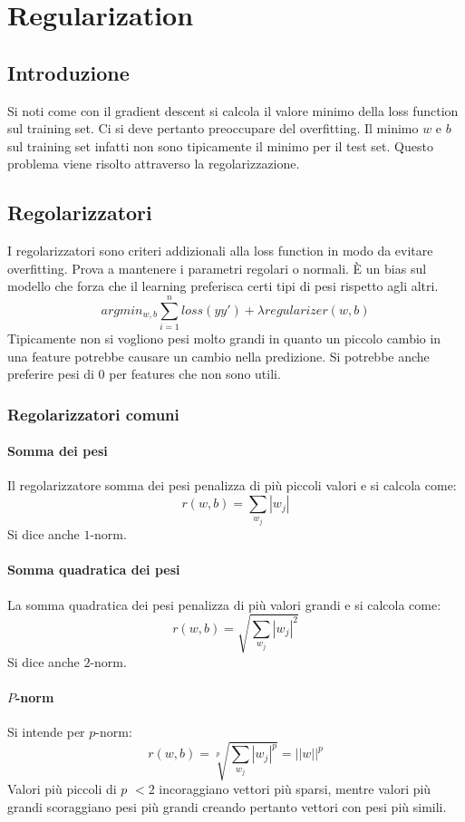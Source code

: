 \chapter{Regularization}

\section{Introduzione}
Si noti come con il gradient descent si calcola il valore minimo della loss function sul training set.
Ci si deve pertanto preoccupare del overfitting.
Il minimo $w$ e $b$ sul training set infatti non sono tipicamente il minimo per il test set.
Questo problema viene risolto attraverso la regolarizzazione.

\section{Regolarizzatori}
I regolarizzatori sono criteri addizionali alla loss function in modo da evitare overfitting.
Prova a mantenere i parametri regolari o normali.
\`E un bias sul modello che forza che il learning preferisca certi tipi di pesi rispetto agli altri.
$$argmin_{w,b}\sum\limits_{i=1}^nloss(yy')+\lambda regularizer(w,b)$$
Tipicamente non si vogliono pesi molto grandi in quanto un piccolo cambio in una feature potrebbe causare un cambio nella predizione.
Si potrebbe anche preferire pesi di $0$ per features che non sono utili.

	\subsection{Regolarizzatori comuni}

		\subsubsection{Somma dei pesi}
		Il regolarizzatore somma dei pesi penalizza di pi\`u piccoli valori e si calcola come:
		$$r(w,b)=\sum\limits_{w_j}|w_j|$$
		Si dice anche $1$-norm.

		\subsubsection{Somma quadratica dei pesi}
		La somma quadratica dei pesi penalizza di pi\`u valori grandi e si calcola come:
		$$r(w,b)=\sqrt{\sum\limits_{w_j}|w_j|^2}$$
		Si dice anche $2$-norm.

		\subsubsection{$P$-norm}
		Si intende per $p$-norm:
		$$r(w,b)=\sqrt[p]{\sum\limits_{w_j}|w_j|^p}=||w||^p$$
		Valori pi\`u piccoli di $p$ $<2$ incoraggiano vettori pi\`u sparsi, mentre valori pi\`u grandi scoraggiano pesi pi\`u grandi creando pertanto vettori con pesi pi\`u simili.

